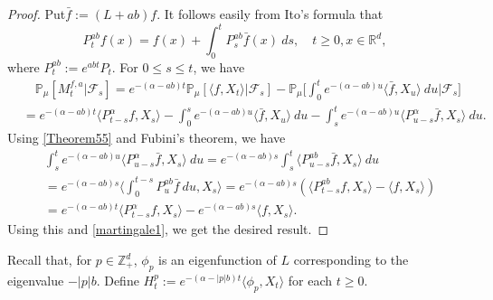 \documentclass[12pt,a4paper]{amsart}
\theoremstyle{plain}
\theoremstyle{definition}
\numberwithin{equation}{section}
\begin{document}
\begin{proof}
  Put$\bar{f} :=(L+ab)f$.
  It follows easily from Ito's formula that
\begin{equation}
  \label{Theorem55}
  P_t^{ab}f(x)
  = f(x)+\int_0^t P_s^{ab}\bar{f}(x)~ds,\quad t\geq 0,x\in \mathbb R^d,
\end{equation}
where $P_t^{ab} := e^{abt}P_t$.
For $0\leq s\leq t$, we have
\begin{align}
  \label{martingale1}
  & \quad\mathbb{P}_{\mu}[M_t^{f,a}|\mathscr{F}_s]
    =e^{-(\alpha-ab)t}\mathbb{P}_{\mu}\left[\langle f,X_t\rangle|\mathscr{F}_s\right]-\mathbb{P}_{\mu}\Big[\int_0^t e^{-(\alpha-ab)u}\langle \bar{f}, X_u\rangle~ du\Big|\mathscr{F}_s\big] \\
  & =e^{-(\alpha-ab)t}\langle P_{t-s}^{\alpha}f, X_s\rangle-\int_0^s e^{-(\alpha-ab)u}\langle \bar{f}, X_u\rangle~ du - \int_s^t e^{-(\alpha-ab)u}\langle P_{u-s}^{\alpha} \bar{f},X_s\rangle~ du.
\end{align}
Using \eqref{Theorem55} and Fubini's theorem, we have
\begin{align}
  & \int_s^t e^{-(\alpha-ab)u}\langle P_{u-s}^{\alpha} \bar{f},X_s\rangle~ du=e^{-(\alpha-ab)s}\int_s^t\langle P_{u-s}^{ab}\bar{f},X_s\rangle~du\\
  & = e^{ - ( \alpha - ab ) s } \Big \langle \int_0^{t-s} P_{u}^{ab} \bar{f}~ du, X_s \Big \rangle
    = e^{-(\alpha-ab)s}\left(\langle P_{t-s}^{ab}f,X_s\rangle-\langle
    f, X_s \rangle \right) \\
  & = e^{-(\alpha-ab)t}\langle P_{t-s}^{\alpha}f, X_s\rangle - e^{ - ( \alpha - ab ) s} \langle
    f,X_s\rangle.
\end{align}
Using this and \eqref{martingale1}, we get the desired result.
\end{proof}

Recall that, for $p\in \mathbb Z_+^d$,  $\phi_p$ is an eigenfunction of $L$ corresponding to the eigenvalue $-|p|b$. Define
\(
  H_t^p
  :=e^{-(\alpha-|p|b)t}\langle\phi_p,X_t\rangle
\)
for each $t\geq 0$.
\end{document}
